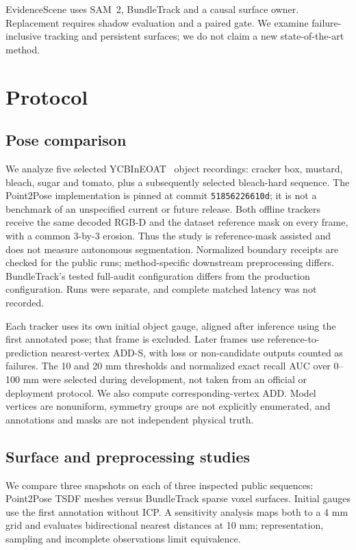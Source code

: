 \documentclass[10pt,journal]{IEEEtran}
\begin{document}
EvidenceScene uses SAM~2, BundleTrack and a causal surface owner. Replacement requires shadow evaluation and a paired gate. We examine failure-inclusive tracking and persistent surfaces; we do not claim a new state-of-the-art method.

\section{Protocol}
\subsection{Pose comparison}
We analyze five selected YCBInEOAT~\cite{tracknet} object recordings: cracker box, mustard, bleach, sugar and tomato, plus a subsequently selected bleach-hard sequence. The Point2Pose implementation is pinned at commit \texttt{51856226610d}; it is not a benchmark of an unspecified current or future release. Both offline trackers receive the same decoded RGB-D and the dataset reference mask on every frame, with a common 3-by-3 erosion. Thus the study is reference-mask assisted and does not measure autonomous segmentation. Normalized boundary receipts are checked for the public runs; method-specific downstream preprocessing differs. BundleTrack's tested full-audit configuration differs from the production configuration. Runs were separate, and complete matched latency was not recorded.

Each tracker uses its own initial object gauge, aligned after inference using the first annotated pose; that frame is excluded. Later frames use reference-to-prediction nearest-vertex ADD-S, with loss or non-candidate outputs counted as failures. The 10 and 20 mm thresholds and normalized exact recall AUC over 0--100 mm were selected during development, not taken from an official or deployment protocol. We also compute corresponding-vertex ADD. Model vertices are nonuniform, symmetry groups are not explicitly enumerated, and annotations and masks are not independent physical truth.

\subsection{Surface and preprocessing studies}
We compare three snapshots on each of three inspected public sequences: Point2Pose TSDF meshes versus BundleTrack sparse voxel surfaces. Initial gauges use the first annotation without ICP. A sensitivity analysis maps both to a 4 mm grid and evaluates bidirectional nearest distances at 10 mm; representation, sampling and incomplete observations limit equivalence.
\end{document}
